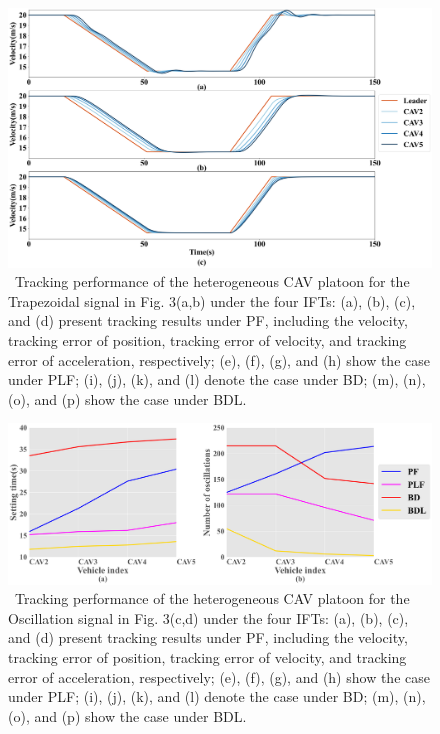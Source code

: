 \documentclass[a4paper]{cas-sc}
\begin{document}
\begin{figure}

  \centering
  \includegraphics[width=14cm]{figs/fig9.png}
  \caption{~Tracking performance of the heterogeneous CAV platoon for the Trapezoidal signal in Fig. 3(a,b) under the four IFTs: (a), (b), (c), and (d) present tracking results under PF, including the velocity, tracking error of position, tracking error of velocity, and tracking error of acceleration, respectively; (e), (f), (g), and (h) show the case under PLF; (i), (j), (k), and (l) denote the case under BD; (m), (n), (o), and (p) show the case under BDL.}
  \label{fig9}
\end{figure}


\begin{figure}

  \centering
  \includegraphics[width=14cm]{figs/fig10.png}
  \caption{~Tracking performance of the heterogeneous CAV platoon for the Oscillation signal in Fig. 3(c,d) under the four IFTs: (a), (b), (c), and (d) present tracking results under PF, including the velocity, tracking error of position, tracking error of velocity, and tracking error of acceleration, respectively; (e), (f), (g), and (h) show the case under PLF; (i), (j), (k), and (l) denote the case under BD; (m), (n), (o), and (p) show the case under BDL.}
  \label{fig10}
\end{figure}
\end{document}
